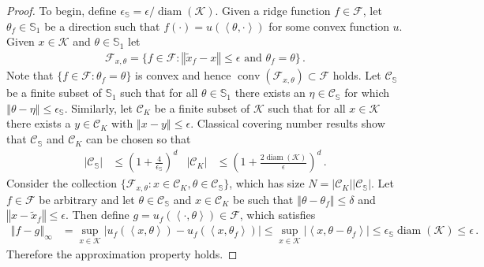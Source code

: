 \documentclass[letter, 12pt]{report}
\newcommand{\ip}[1]{\left \langle #1 \right \rangle}
\newcommand{\sphere}{\mathbb{S}}
\newcommand{\norm}[1]{\left \Vert  #1 \right \Vert}
\newcommand{\cK}{\mathcal K}
\newcommand{\cC}{\mathcal C}
\newcommand{\sF}{\mathscr F}
\newcommand{\conv}{\operatorname{conv}}
\newcommand{\diam}{\operatorname{diam}}
\newcommand{\1}{\mathbf{1}}
\theoremstyle{plain}
\theoremstyle{definition}
\theoremstyle{remark}
\begin{document}
\begin{proof}
    To begin, define $\epsilon_{\mathbb S} = \epsilon/\diam(\cK)$.
    Given a ridge function $f \in \sF$, let $\theta_f \in \sphere_1$ be a direction such that $f(\cdot) = u(\ip{\theta, \cdot})$ for some convex function $u$.
    Given $x \in \cK$ and $\theta \in \sphere_1$ let
    \begin{align*}
        \sF_{x,\theta} = \{f \in \sF : \norm{\tilde x_f - x} \leq \epsilon \text{ and } \theta_f = \theta\} \,.
    \end{align*}
    Note that $\{f \in \sF : \theta_f = \theta\}$ is convex and hence $\conv(\sF_{x,\theta}) \subset \sF$ holds.
    Let $\cC_{\mathbb S}$ be a finite subset of $\sphere_1$ such that for all $\theta \in \sphere_1$ there exists an $\eta \in \cC_{\mathbb S}$
    for which $\norm{\theta - \eta} \leq \epsilon_{\mathbb S}$.
    Similarly, let $\cC_K$ be a finite subset of $\cK$ such that for all $x \in \cK$ there exists a $y \in \cC_K$ with $\norm{x - y} \leq \epsilon$.
    Classical covering number results \citep[\S4]{ASG15} show that $\cC_{\mathbb S}$ and $\cC_K$ can be chosen so that
    \begin{align*}
        |\cC_{\mathbb S}| & \leq \left(1 + \frac{4}{\epsilon_{\mathbb S}}\right)^d    &
        |\cC_K|           & \leq \left(1 + \frac{2 \diam(\cK)}{\epsilon}\right)^d \,.
    \end{align*}
    Consider the collection $\{\sF_{x,\theta} : x \in \cC_K, \theta \in \cC_{\mathbb S}\}$, which has size $N = |\cC_K| |\cC_{\mathbb S}|$.
    Let $f \in \sF$ be arbitrary and let $\theta \in \cC_{\mathbb S}$ and $x \in \cC_K$ be such that
    $\norm{\theta - \theta_f} \leq \delta$ and $\norm{x - \tilde x_f} \leq \epsilon$.
    Then define $g = u_f(\ip{\cdot, \theta}) \in \sF$, which satisfies
    \begin{align*}
        \norm{f - g}_\infty
         & = \sup_{x \in \cK} |u_f(\ip{x, \theta}) - u_f(\ip{x, \theta_f})|
        \leq \sup_{x \in \cK} |\ip{x, \theta - \theta_f}|
        \leq \epsilon_{\mathbb S} \diam(\cK)
        \leq \epsilon \,.
    \end{align*}
    Therefore the approximation property holds.
\end{proof}
\end{document}
